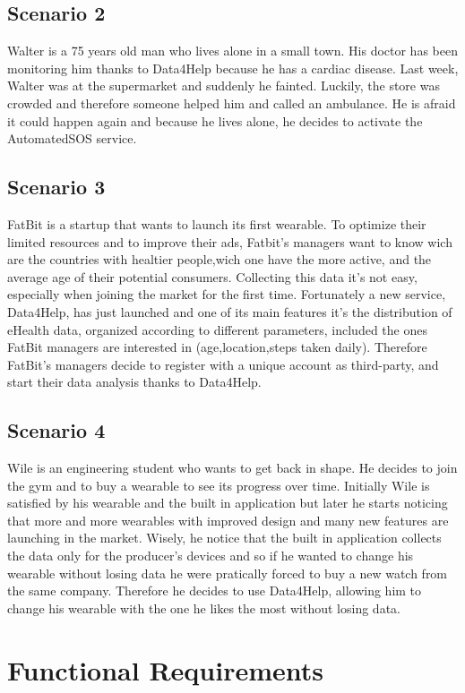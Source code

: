 \subsection{Scenario 2}
Walter is a 75 years old man who lives alone in a small town.
His doctor has been monitoring him thanks to Data4Help because he has a cardiac disease.
Last week, Walter was at the supermarket and suddenly he fainted. Luckily, the store was crowded and therefore someone helped him and called an ambulance.
He is afraid it could happen again and because he lives alone, he decides to activate the AutomatedSOS service.


\subsection{Scenario 3}
FatBit is a startup that wants to launch its first wearable. To optimize their limited resources and to improve their ads, Fatbit's managers want to know wich are the countries with healtier people,wich one have the more active, and the average age of their potential consumers. Collecting this data it's not easy, especially when joining the market for the first time. Fortunately a new service, Data4Help, has just launched and one of its main features it's the distribution of eHealth data, organized according to different parameters, included the ones FatBit managers are interested in (age,location,steps taken daily).
Therefore FatBit's managers decide to register with a unique account as third-party, and start their data analysis thanks to Data4Help.


\subsection{Scenario 4}
Wile is an engineering student who wants to get back in shape. He decides to join the gym and to buy a wearable to see its progress over time. Initially Wile is satisfied by his wearable and the built in application but later he starts noticing that more and more wearables with improved design and many new features are launching in the market. Wisely, he notice that the built in application collects the data only for the producer's devices and so if he wanted to change his wearable without losing data he were pratically forced to buy a new watch from the same company. Therefore he decides to use Data4Help, allowing him to change his wearable with the one he likes the most without losing data.

\section{Functional Requirements}

